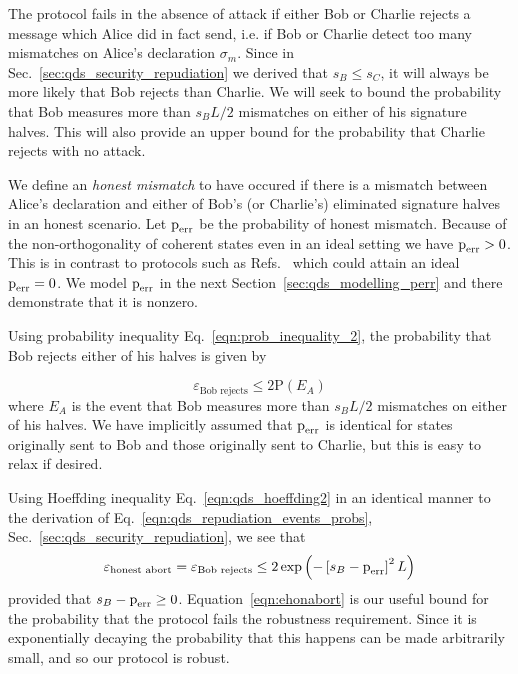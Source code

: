 The protocol fails in the absence of attack if either Bob or Charlie rejects a message which Alice did in fact send, i.e. if Bob or Charlie detect too many mismatches on Alice's declaration $\sigma_m$. Since in Sec.~\ref{sec:qds_security_repudiation} we derived that $s_B \le s_C$, it will always be more likely that Bob rejects than Charlie. We will seek to bound the probability that Bob measures more than $s_B L/2$ mismatches on either of his signature halves. This will also provide an upper bound for the probability that Charlie rejects with no attack.

We define an \emph{honest mismatch} to have occured if there is a mismatch between Alice's declaration and either of Bob's (or Charlie's) eliminated signature halves in an honest scenario. Let $\text{p}_{\text{err}}$ be the probability of honest mismatch. Because of the non-orthogonality of coherent states even in an ideal setting we have $\text{p}_{\text{err}} > 0$. This is in contrast to protocols such as Refs.~\cite{Donaldson2016, Collins2014} which could attain an ideal $\text{p}_{\text{err}} = 0$. We model $\text{p}_{\text{err}}$ in the next Section~\ref{sec:qds_modelling_perr} and there demonstrate that it is nonzero.

Using probability inequality Eq.~\ref{eqn:prob_inequality_2}, the probability that Bob rejects either of his halves is given by

\begin{equation}
\varepsilon_{\text{Bob rejects}} \le 2 \text{P}\left(E_A\right)
\end{equation}
where $E_A$ is the event that Bob measures more than $s_B L/2$ mismatches on either of his halves. We have implicitly assumed that $\text{p}_{\text{err}}$ is identical for states originally sent to Bob and those originally sent to Charlie, but this is easy to relax if desired.

Using Hoeffding inequality Eq.~\ref{eqn:qds_hoeffding2} in an identical manner to the derivation of Eq.~\ref{eqn:qds_repudiation_events_probs}, Sec.~\ref{sec:qds_security_repudiation}, we see that
\begin{equation}\label{eqn:ehonabort}
\varepsilon_{\text{honest abort}} = \varepsilon_{\text{Bob rejects}} \le 2 \exp\left( - \left[s_B -\text{p}_{\text{err}}\right]^2 L\right)
\end{equation}
provided that $s_B - \text{p}_{\text{err}} \ge 0$. Equation~\ref{eqn:ehonabort} is our useful bound for the probability that the protocol fails the robustness requirement. Since it is exponentially decaying the probability that this happens can be made arbitrarily small, and so our protocol is robust.

